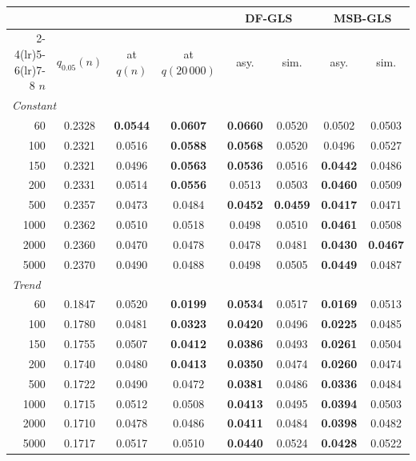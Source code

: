 \begin{tabular}{rccccccc}
\toprule
& \multicolumn{3}{c}{\RMGLS{}} & \multicolumn{2}{c}{DF-GLS} & \multicolumn{2}{c}{MSB-GLS}\\
\cmidrule(lr){2-4}\cmidrule(lr){5-6}\cmidrule(lr){7-8}
$n$ & $q_{0.05}(n)$ & at $q(n)$ & at $q(20\,000)$ & asy. & sim. & asy. & sim.\\
\midrule
\multicolumn{8}{l}{\emph{Constant}}\\
60 & 0.2328 & \textbf{0.0544} & \textbf{0.0607} & \textbf{0.0660} & 0.0520 & 0.0502 & 0.0503 \\
100 & 0.2321 & 0.0516 & \textbf{0.0588} & \textbf{0.0568} & 0.0520 & 0.0496 & 0.0527 \\
150 & 0.2321 & 0.0496 & \textbf{0.0563} & \textbf{0.0536} & 0.0516 & \textbf{0.0442} & 0.0486 \\
200 & 0.2331 & 0.0514 & \textbf{0.0556} & 0.0513 & 0.0503 & \textbf{0.0460} & 0.0509 \\
500 & 0.2357 & 0.0473 & 0.0484 & \textbf{0.0452} & \textbf{0.0459} & \textbf{0.0417} & 0.0471 \\
1000 & 0.2362 & 0.0510 & 0.0518 & 0.0498 & 0.0510 & \textbf{0.0461} & 0.0508 \\
2000 & 0.2360 & 0.0470 & 0.0478 & 0.0478 & 0.0481 & \textbf{0.0430} & \textbf{0.0467} \\
5000 & 0.2370 & 0.0490 & 0.0488 & 0.0498 & 0.0505 & \textbf{0.0449} & 0.0487 \\
\multicolumn{8}{l}{\emph{Trend}}\\
60 & 0.1847 & 0.0520 & \textbf{0.0199} & \textbf{0.0534} & 0.0517 & \textbf{0.0169} & 0.0513 \\
100 & 0.1780 & 0.0481 & \textbf{0.0323} & \textbf{0.0420} & 0.0496 & \textbf{0.0225} & 0.0485 \\
150 & 0.1755 & 0.0507 & \textbf{0.0412} & \textbf{0.0386} & 0.0493 & \textbf{0.0261} & 0.0504 \\
200 & 0.1740 & 0.0480 & \textbf{0.0413} & \textbf{0.0350} & 0.0474 & \textbf{0.0260} & 0.0474 \\
500 & 0.1722 & 0.0490 & 0.0472 & \textbf{0.0381} & 0.0486 & \textbf{0.0336} & 0.0484 \\
1000 & 0.1715 & 0.0512 & 0.0508 & \textbf{0.0413} & 0.0495 & \textbf{0.0394} & 0.0503 \\
2000 & 0.1710 & 0.0478 & 0.0486 & \textbf{0.0411} & 0.0484 & \textbf{0.0398} & 0.0482 \\
5000 & 0.1717 & 0.0517 & 0.0510 & \textbf{0.0440} & 0.0524 & \textbf{0.0428} & 0.0522 \\
\bottomrule
\end{tabular}
